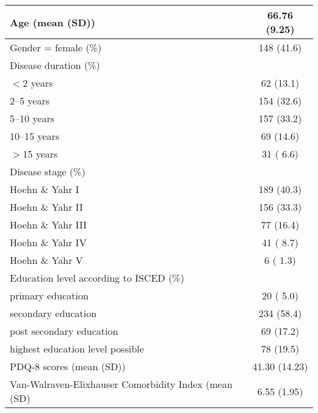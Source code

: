 \documentclass[a4paper,oneside,11pt,english]{scrartcl}
\begin{document}
\begin{table}[h!]
\begin{tabular}{p{10cm} c}
		Age (mean (SD)) & 66.76 (9.25) \\ \hline
		Gender = female (\%) &  148 (41.6)  \\ \hline
		Disease duration (\%) & \\ \hline
		\hspace{3mm} $<$2 years & 62 (13.1) \\ \hline
		\hspace{3mm} 2--5 years & 154 (32.6) \\ \hline
		\hspace{3mm} 5--10 years & 157 (33.2) \\ \hline
		\hspace{3mm} 10--15 years & 69 (14.6) \\ \hline
		\hspace{3mm} $>$15 years& 31 ( 6.6) \\ \hline
		Disease stage (\%)& \\ \hline
		\hspace{3mm} Hoehn \& Yahr I &  189 (40.3) \\ \hline
		\hspace{3mm} Hoehn \& Yahr II & 156 (33.3)  \\ \hline
		\hspace{3mm} Hoehn \& Yahr III  &   77 (16.4) \\ \hline
		\hspace{3mm} Hoehn \& Yahr IV  & 41 ( 8.7) \\ \hline
		\hspace{3mm} Hoehn \& Yahr V  &     6 ( 1.3) \\ \hline
		Education level according to ISCED (\%) & \\ \hline
		\hspace{3mm} primary education  & 20 ( 5.0) \\ \hline
		\hspace{3mm} secondary education  & 234 (58.4)\\ \hline
		\hspace{3mm} post secondary education  &   69 (17.2) \\ \hline
		\hspace{3mm} highest education level possible & 78 (19.5)  \\ \hline
		\hspace{3mm} \textsc{PD}Q-8 scores (mean (SD)) & 41.30 (14.23) \\ \hline
		Van-Walraven-Elixhauser Comorbidity Index (mean (SD) & 6.55 (1.95) \\ \hline
		\bottomrule
	\end{tabular}
\end{table}
\end{document}
